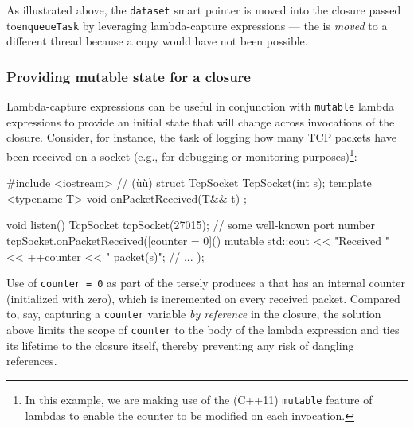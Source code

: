 \noindent As illustrated above, the \lstinline!dataset! smart pointer is moved into
the closure passed to\linebreak[4] \mbox{\lstinline!enqueueTask!} by leveraging lambda-capture
expressions --- the  is \emph{moved}
to a different thread because a copy would have not been possible.

\subsubsection[Providing mutable state for a closure]{Providing mutable state for a closure}\label{providing-mutable-state-for-a-closure}

Lambda-capture expressions can be useful in conjunction with
\lstinline!mutable! lambda expressions to provide an initial state that
will change across invocations of the closure. Consider, for instance,
the task of logging how many TCP packets have been received on a socket
(e.g., for debugging or monitoring purposes){\cprotect\footnote{In
this example, we are making use of the (C++11) \lstinline!mutable! feature
  of lambdas to enable the counter to be modified on each invocation.}}:

\begin{emcppshiddenlisting}[emcppsbatch=e2]
#include <iostream>  // (ù{}ù)
struct TcpSocket {
    TcpSocket(int s);
    template <typename T>
    void onPacketReceived(T&& t) {}
};

\end{emcppshiddenlisting}
\begin{emcppslisting}[emcppsbatch=e2,emcppsstandards={c++14}]
void listen()
{
    TcpSocket tcpSocket(27015);  // some well-known port number
    tcpSocket.onPacketReceived([counter = 0]() mutable
    {
        std::cout << "Received " << ++counter << " packet(s)\n";
        // ...
    });
}
\end{emcppslisting}

\noindent Use of \lstinline!counter!~\lstinline!=!~\lstinline!0! as part of the
 tersely produces a 
that has an internal counter (initialized with zero), which is
incremented on every received packet. Compared to, say, capturing a
\lstinline!counter! variable \emph{by reference} in the closure, the solution
above limits the scope of \lstinline!counter! to the body of the lambda
expression and ties its lifetime to the closure itself, thereby
preventing any risk of dangling references.

